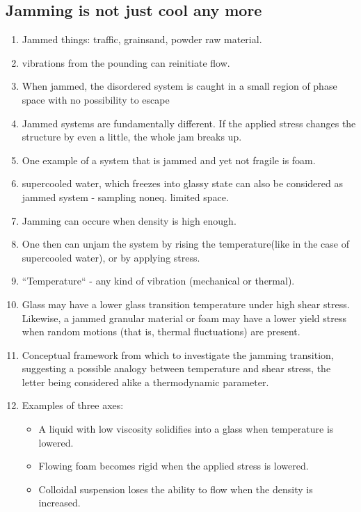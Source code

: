 \documentclass[10pt,a4paper]{article}
\begin{document}
\subsection{Jamming is not just cool any more\cite{nagel:98}}
\begin{enumerate}
 \item Jammed things: traffic, grainsand, powder raw material.
 \item vibrations from the pounding can reinitiate flow.
 \item When jammed, the disordered system is caught in a small region of phase space with no possibility to escape
 \item Jammed systems are fundamentally different. If the applied stress changes the structure by even a little, the whole jam breaks up. 
 \item One example of a system that is jammed and yet not fragile is foam.
 \item supercooled water, which freezes into glassy state can also be considered as jammed system - sampling noneq. limited space.
 \item Jamming can occure when density is high enough. 
 \item One then can unjam the system by rising the temperature(like in the case of supercooled water), or by applying stress. 
 \item ``Temperature`` - any kind of vibration (mechanical or thermal).
 \item Glass may have a lower glass transition temperature under high shear stress. 
 Likewise, a jammed granular material or foam may have a lower yield stress when random motions (that is, thermal fluctuations) are present.
 \item Conceptual framework from which to investigate the jamming transition, 
 suggesting a possible analogy between temperature and shear stress, the letter being considered alike a thermodynamic parameter.
 \item Examples of three axes:
 \begin{itemize}
  \item A liquid with low viscosity solidifies into a glass when temperature is lowered.
  \item Flowing foam becomes rigid when the applied stress is lowered.
  \item Colloidal suspension loses the ability to flow when the density is increased. 
 \end{itemize}

\end{enumerate}
\end{document}
